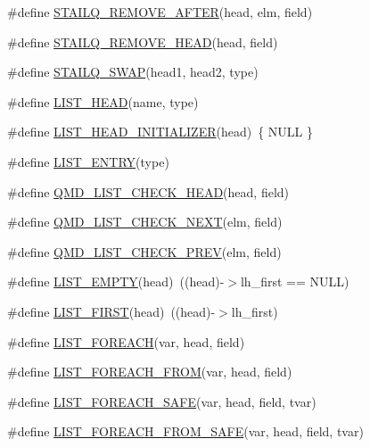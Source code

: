 \begin{DoxyCompactItemize}
\item 
\#define \hyperlink{queue_8h_a657c50417f3caeab52e34fcd454cec71}{S\-T\-A\-I\-L\-Q\-\_\-\-R\-E\-M\-O\-V\-E\-\_\-\-A\-F\-T\-E\-R}(head, elm, field)
\item 
\#define \hyperlink{queue_8h_a24c16c7c5c9908022bad7a98ddac9740}{S\-T\-A\-I\-L\-Q\-\_\-\-R\-E\-M\-O\-V\-E\-\_\-\-H\-E\-A\-D}(head, field)
\item 
\#define \hyperlink{queue_8h_af30e7c9283aea226ad5a73575fc1601a}{S\-T\-A\-I\-L\-Q\-\_\-\-S\-W\-A\-P}(head1, head2, type)
\item 
\#define \hyperlink{queue_8h_ae72219f63b2fe9bce774a64e11404179}{L\-I\-S\-T\-\_\-\-H\-E\-A\-D}(name, type)
\item 
\#define \hyperlink{queue_8h_a5d7b8e9f9968d3152a8519cd9a45312e}{L\-I\-S\-T\-\_\-\-H\-E\-A\-D\-\_\-\-I\-N\-I\-T\-I\-A\-L\-I\-Z\-E\-R}(head)~\{ N\-U\-L\-L \}
\item 
\#define \hyperlink{queue_8h_aec2ccd0e8c215504508af23f04480be6}{L\-I\-S\-T\-\_\-\-E\-N\-T\-R\-Y}(type)
\item 
\#define \hyperlink{queue_8h_a56b1069d0673242f84246986614b15cc}{Q\-M\-D\-\_\-\-L\-I\-S\-T\-\_\-\-C\-H\-E\-C\-K\-\_\-\-H\-E\-A\-D}(head, field)
\item 
\#define \hyperlink{queue_8h_a98d7f73cec635caf9515945f0d5413f6}{Q\-M\-D\-\_\-\-L\-I\-S\-T\-\_\-\-C\-H\-E\-C\-K\-\_\-\-N\-E\-X\-T}(elm, field)
\item 
\#define \hyperlink{queue_8h_aa03b790c1e9ea4475fff822f2f924770}{Q\-M\-D\-\_\-\-L\-I\-S\-T\-\_\-\-C\-H\-E\-C\-K\-\_\-\-P\-R\-E\-V}(elm, field)
\item 
\#define \hyperlink{queue_8h_af59ab30a8f9a88af86422600c38125cf}{L\-I\-S\-T\-\_\-\-E\-M\-P\-T\-Y}(head)~((head)-\/$>$lh\-\_\-first == N\-U\-L\-L)
\item 
\#define \hyperlink{queue_8h_a8f223070a7fe7c5f24033e9d8fbeb610}{L\-I\-S\-T\-\_\-\-F\-I\-R\-S\-T}(head)~((head)-\/$>$lh\-\_\-first)
\item 
\#define \hyperlink{queue_8h_ac1543beeb6d9224b60feb7a2703b2a87}{L\-I\-S\-T\-\_\-\-F\-O\-R\-E\-A\-C\-H}(var, head, field)
\item 
\#define \hyperlink{queue_8h_abb233e757b72211906fce14e8dbfcada}{L\-I\-S\-T\-\_\-\-F\-O\-R\-E\-A\-C\-H\-\_\-\-F\-R\-O\-M}(var, head, field)
\item 
\#define \hyperlink{queue_8h_a2dd4b5313ff322ed89827dede22589e8}{L\-I\-S\-T\-\_\-\-F\-O\-R\-E\-A\-C\-H\-\_\-\-S\-A\-F\-E}(var, head, field, tvar)
\item 
\#define \hyperlink{queue_8h_acc9a82d352391194a56688d2d0f992c0}{L\-I\-S\-T\-\_\-\-F\-O\-R\-E\-A\-C\-H\-\_\-\-F\-R\-O\-M\-\_\-\-S\-A\-F\-E}(var, head, field, tvar)

\end{DoxyCompactItemize}
